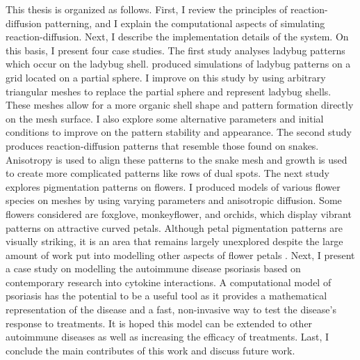
This thesis is organized as follows. First, I review the principles of reaction-diffusion patterning, and I explain the computational aspects of simulating reaction-diffusion. Next, I describe the implementation details of the \ProgramName{} system. On this basis, I present four case studies. The first study analyses ladybug patterns which occur on the ladybug shell. \citep{liaw2001} produced simulations of ladybug patterns on a grid located on a partial sphere. I improve on this study by using arbitrary triangular meshes to replace the partial sphere and represent ladybug shells. These meshes allow for a more organic shell shape and pattern formation directly on the mesh surface. I also explore some alternative parameters and initial conditions to improve on the pattern stability and appearance. The second study produces reaction-diffusion patterns that resemble those found on snakes. Anisotropy is used to align these patterns to the snake mesh and growth is used to create more complicated patterns like rows of dual spots. The next study explores pigmentation patterns on flowers. I produced models of various flower species on meshes by using varying parameters and anisotropic diffusion. Some flowers considered are foxglove, monkeyflower, and orchids, which display vibrant patterns on attractive curved petals. Although petal pigmentation patterns are visually striking, it is an area that remains largely unexplored despite the large amount of work put into modelling other aspects of flower petals \citep{owens2016}. Next, I present a case study on modelling the autoimmune disease psoriasis based on contemporary research into cytokine interactions. A computational model of psoriasis has the potential to be a useful tool as it provides a mathematical representation of the disease and a fast, non-invasive way to test the disease's response to treatments. It is hoped this model can be extended to other autoimmune diseases as well as increasing the efficacy of treatments. Last, I conclude the main contributes of this work and discuss future work.

